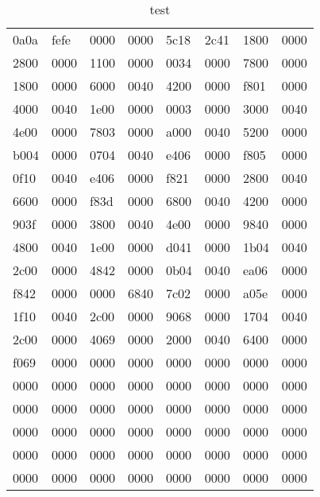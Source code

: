 \begin{center} 
\begin{table} 
\centering 
\caption{test} 
\begin{tabular}{llllllll} 
\toprule 
0a0a & fefe & 0000 & 0000 & 5c18 & 2c41 & 1800 & 0000
 \\ 
2800 & 0000 & 1100 & 0000 & 0034 & 0000 & 7800 & 0000
 \\ 
1800 & 0000 & 6000 & 0040 & 4200 & 0000 & f801 & 0000
 \\ 
4000 & 0040 & 1e00 & 0000 & 0003 & 0000 & 3000 & 0040
 \\ 
4e00 & 0000 & 7803 & 0000 & a000 & 0040 & 5200 & 0000
 \\ 
b004 & 0000 & 0704 & 0040 & e406 & 0000 & f805 & 0000
 \\ 
0f10 & 0040 & e406 & 0000 & f821 & 0000 & 2800 & 0040
 \\ 
6600 & 0000 & f83d & 0000 & 6800 & 0040 & 4200 & 0000
 \\ 
903f & 0000 & 3800 & 0040 & 4e00 & 0000 & 9840 & 0000
 \\ 
4800 & 0040 & 1e00 & 0000 & d041 & 0000 & 1b04 & 0040
 \\ 
2c00 & 0000 & 4842 & 0000 & 0b04 & 0040 & ea06 & 0000
 \\ 
f842 & 0000 & 0000 & 6840 & 7c02 & 0000 & a05e & 0000
 \\ 
1f10 & 0040 & 2c00 & 0000 & 9068 & 0000 & 1704 & 0040
 \\ 
2c00 & 0000 & 4069 & 0000 & 2000 & 0040 & 6400 & 0000
 \\ 
f069 & 0000 & 0000 & 0000 & 0000 & 0000 & 0000 & 0000
 \\ 
0000 & 0000 & 0000 & 0000 & 0000 & 0000 & 0000 & 0000
 \\ 
0000 & 0000 & 0000 & 0000 & 0000 & 0000 & 0000 & 0000
 \\ 
0000 & 0000 & 0000 & 0000 & 0000 & 0000 & 0000 & 0000
 \\ 
0000 & 0000 & 0000 & 0000 & 0000 & 0000 & 0000 & 0000
 \\ 
0000 & 0000 & 0000 & 0000 & 0000 & 0000 & 0000 & 0000 \\ 
\bottomrule 
\end{tabular} 
\end{table} 
\end{center} 
